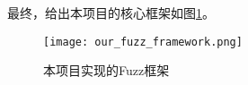 最终，给出本项目的核心框架如图\ref{pic:off}。

\begin{figure}[h]
    \centering
    \texttt{[image: our\_fuzz\_framework.png]}
    \caption{本项目实现的Fuzz框架}
    \label{pic:off}
\end{figure}